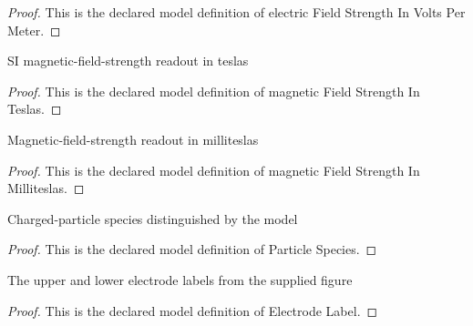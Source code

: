 \begin{proof}
  This is the declared model definition of electric Field Strength In Volts Per Meter.
\end{proof}
\begin{definition}
  \label{def:physics:phyx-mini-0496:phyxminiproblems-problemphyxmini0496-magneticfieldstrengthinteslas}
  SI magnetic-field-strength readout in teslas
\end{definition}
\begin{proof}
  This is the declared model definition of magnetic Field Strength In Teslas.
\end{proof}
\begin{definition}
  \label{def:physics:phyx-mini-0496:phyxminiproblems-problemphyxmini0496-magneticfieldstrengthinmilliteslas}
  Magnetic-field-strength readout in milliteslas
\end{definition}
\begin{proof}
  This is the declared model definition of magnetic Field Strength In Milliteslas.
\end{proof}
\begin{definition}
  \label{def:physics:phyx-mini-0496:phyxminiproblems-problemphyxmini0496-particlespecies}
  Charged-particle species distinguished by the model
\end{definition}
\begin{proof}
  This is the declared model definition of Particle Species.
\end{proof}
\begin{definition}
  \label{def:physics:phyx-mini-0496:phyxminiproblems-problemphyxmini0496-electrodelabel}
  The upper and lower electrode labels from the supplied figure
\end{definition}
\begin{proof}
  This is the declared model definition of Electrode Label.
\end{proof}
